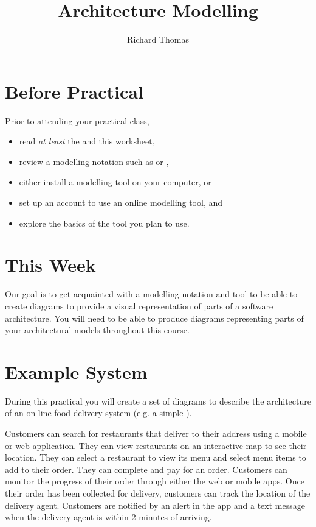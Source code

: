 \documentclass{csse4400}
\title{Architecture Modelling}
\author{Richard Thomas}
\date{\week{2}}
\begin{document}
\maketitle

\section{Before Practical}
Prior to attending your practical class,
\begin{itemize}[nosep]
    \item read \emph{at least} the  and this worksheet,
    \item review a modelling notation such as  or ,
    \item either install a modelling tool on your computer, or
    \item set up an account to use an online modelling tool, and
    \item explore the basics of the tool you plan to use.
\end{itemize}


\section{This Week}
Our goal is to get acquainted with a modelling notation and tool to be able to create diagrams to provide a visual representation of parts of a software architecture.
You will need to be able to produce diagrams representing parts of your architectural models throughout this course.


\section{Example System}
During this practical you will create a set of diagrams to describe the architecture of an on-line food delivery system (e.g. a simple ).

Customers can search for restaurants that deliver to their address using a mobile or web application.
They can view restaurants on an interactive map to see their location.
They can select a restaurant to view its menu and select menu items to add to their order.
They can complete and pay for an order.
Customers can monitor the progress of their order through either the web or mobile apps.
Once their order has been collected for delivery, customers can track the location of the delivery agent.
Customers are notified by an alert in the app and a text message when the delivery agent is within 2 minutes of arriving.
\end{document}
